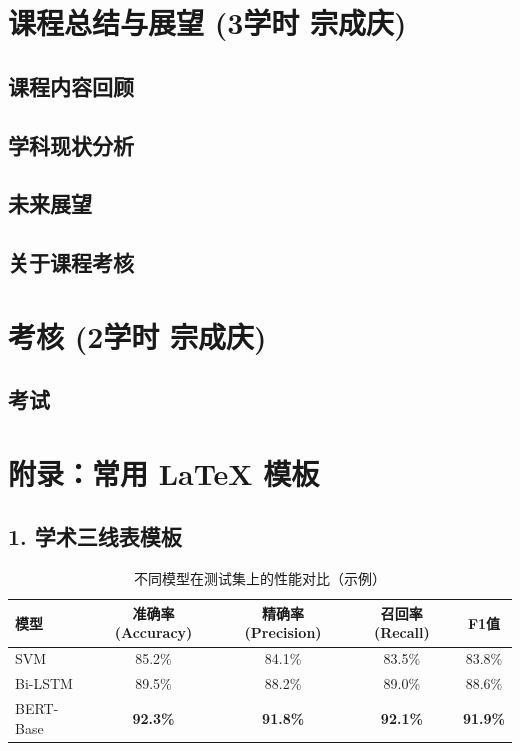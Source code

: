 \documentclass[a4paper, 11pt]{ctexart}
\begin{document}
\section{课程总结与展望 \small{(3学时 宗成庆)}}
\subsection{课程内容回顾}
\subsection{学科现状分析}
\subsection{未来展望}
\subsection{关于课程考核}
\newpage


\section{考核 \small{(2学时 宗成庆)}}
\subsection{考试}
\newpage

\appendix
\section*{附录：常用 LaTeX 模板}

\subsection*{1. 学术三线表模板}
\begin{table}[H]
    \centering
    \caption{不同模型在测试集上的性能对比（示例）}
    \label{tab:performance}
    \begin{tabular}{lcccc} 
        \toprule
        \textbf{模型} & \textbf{准确率 (Accuracy)} & \textbf{精确率 (Precision)} & \textbf{召回率 (Recall)} & \textbf{F1值} \\
        \midrule
        SVM & 85.2\% & 84.1\% & 83.5\% & 83.8\% \\
        Bi-LSTM & 89.5\% & 88.2\% & 89.0\% & 88.6\% \\
        BERT-Base & \textbf{92.3\%} & \textbf{91.8\%} & \textbf{92.1\%} & \textbf{91.9\%} \\
        \bottomrule
    \end{tabular}
\end{table}
\end{document}
